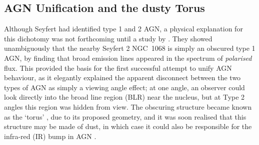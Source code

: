 




\subsection{AGN Unification and the dusty Torus}
\label{agn_unification}

Although Seyfert had identified type 1 and 2 AGN, a physical explanation
for this dichotomy was not forthcoming until a study by \cite[][AM85]{antonucci1985}.
They showed unambiguously that the nearby Seyfert 2 NGC~1068 is simply an obscured
type 1 AGN, by finding that broad emission lines appeared in the spectrum of
{\em polarised} flux. This provided the basis for the first successful attempt
to unify AGN behaviour, as it elegantly 
explained the apparent disconnect between the two types of 
AGN as simply a viewing angle effect; at one angle, an observer could look directly
into the broad line region (BLR) near the nucleus, but at Type 2 angles
this region was hidden from view.
The obscuring structure became known as the `torus' \citep{krolik1986}, 
due to its proposed geometry, and it was soon realised that this structure
may be made of dust, in which case it could also be responsible for the infra-red (IR)
bump in AGN \citep{neugebauer1979}.

